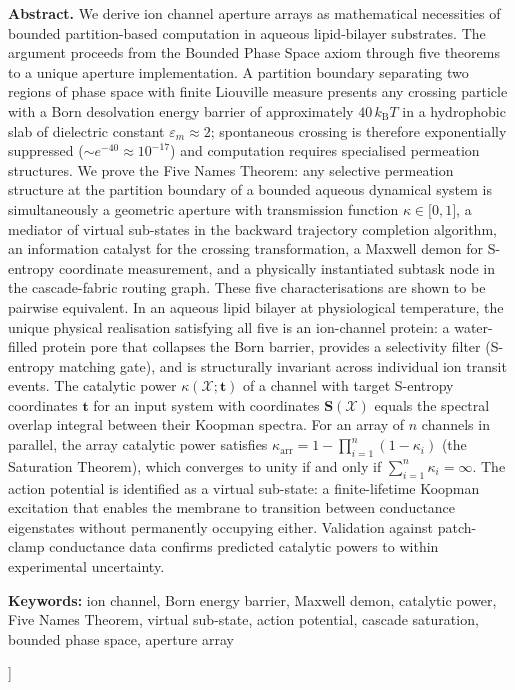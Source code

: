\documentclass[11pt,twocolumn,a4paper]{article}
\theoremstyle{definition}
\theoremstyle{remark}
\newcommand{\kB}{k_{\mathrm{B}}}
\newcommand{\kap}{\kappa}
\newcommand{\Sent}{\bm{S}}
\begin{document}
\begin{@twocolumnfalse}
\begin{center}
\begin{minipage}{0.92\textwidth}
\textbf{Abstract.}
We derive ion channel aperture arrays as mathematical necessities of bounded
partition-based computation in aqueous lipid-bilayer substrates. The argument
proceeds from the Bounded Phase Space axiom through five theorems to a unique
aperture implementation. A partition boundary separating two regions of phase
space with finite Liouville measure presents any crossing particle with a Born
desolvation energy barrier of approximately $40\,\kB T$ in a hydrophobic slab
of dielectric constant $\varepsilon_m \approx 2$; spontaneous crossing is
therefore exponentially suppressed ($\sim e^{-40} \approx 10^{-17}$) and
computation requires specialised permeation structures. We prove the Five Names
Theorem: any selective permeation structure at the partition boundary of a
bounded aqueous dynamical system is simultaneously a geometric aperture with
transmission function $\kap \in \lbrack 0,1\rbrack$, a mediator of virtual sub-states in
the backward trajectory completion algorithm, an information catalyst for the
crossing transformation, a Maxwell demon for S-entropy coordinate measurement,
and a physically instantiated subtask node in the cascade-fabric routing
graph. These five characterisations are shown to be pairwise equivalent.
In an aqueous lipid bilayer at physiological temperature, the unique physical
realisation satisfying all five is an ion-channel protein: a water-filled
protein pore that collapses the Born barrier, provides a selectivity filter
(S-entropy matching gate), and is structurally invariant across individual ion
transit events. The catalytic power $\kap(\mathcal{X}; \mathbf{t})$ of a
channel with target S-entropy coordinates $\mathbf{t}$ for an input system
with coordinates $\Sent(\mathcal{X})$ equals the spectral overlap integral
between their Koopman spectra. For an array of $n$ channels in parallel, the
array catalytic power satisfies $\kap_{\mathrm{arr}} = 1 - \prod_{i=1}^n (1-\kap_i)$
(the Saturation Theorem), which converges to unity if and only if
$\sum_{i=1}^n \kap_i = \infty$. The action potential is identified as a
virtual sub-state: a finite-lifetime Koopman excitation that enables the
membrane to transition between conductance eigenstates without permanently
occupying either. Validation against patch-clamp conductance data confirms
predicted catalytic powers to within experimental uncertainty.
\end{minipage}

\vspace{8pt}
\noindent\textbf{Keywords:}
ion channel, Born energy barrier, Maxwell demon, catalytic power, Five Names Theorem,
virtual sub-state, action potential, cascade saturation, bounded phase space,
aperture array

\vspace{18pt}
\end{center}
\end{@twocolumnfalse}
]
\end{document}
